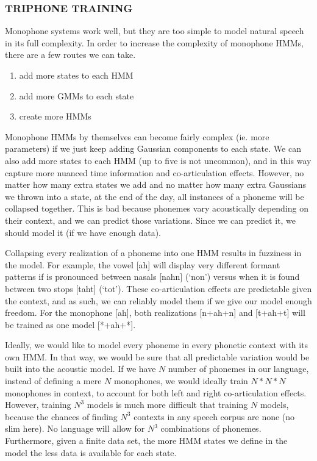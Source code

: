 \documentclass[10pt,a4paper]{article}
\begin{document}
\subsubsection*{TRIPHONE TRAINING}

Monophone systems work well, but they are too simple to model natural speech in its full complexity. In order to increase the complexity of monophone HMMs, there are a few routes we can take.

\begin{enumerate}
\item add more states to each HMM
\item add more GMMs to each state
\item create more HMMs
\end{enumerate}

Monophone HMMs by themselves can become fairly complex (ie. more parameters) if we just keep adding Gaussian components to each state. We can also add more states to each HMM (up to five is not uncommon), and in this way capture more nuanced time information and co-articulation effects. However, no matter how many extra states we add and no matter how many extra Gaussians we thrown into a state, at the end of the day, all instances of a phoneme will be collapsed together. This is bad because phonemes vary acoustically depending on their context, and we can predict those variations. Since we can predict it, we should model it (if we have enough data).

Collapsing every realization of a phoneme into one HMM results in fuzziness in the model. For example, the vowel [ah] will display very different formant patterns if is pronounced between nasals [nahn] (`non') versus when it is found between two stops [taht] (`tot'). These co-articulation effects are predictable given the context, and as such, we can reliably model them if we give our model enough freedom. For the monophone [ah], both realizations [n+ah+n] and [t+ah+t] will be trained as one model [*+ah+*].

Ideally, we would like to model every phoneme in every phonetic context with its own HMM. In that way, we would be sure that all predictable variation would be built into the acoustic model. If we have $N$ number of phonemes in our language, instead of defining a mere $N$ monophones, we would ideally train $N*N*N$ monophones in context, to account for both left and right co-articulation effects. However, training $N^3$ models is much more difficult that training $N$ models, because the chances of finding $N^3$ contexts in any speech corpus are none (no slim here). No language will allow for $N^3$ combinations of phonemes. Furthermore, given a finite data set, the more HMM states we define in the model the less data is available for each state.
  
\end{document}
